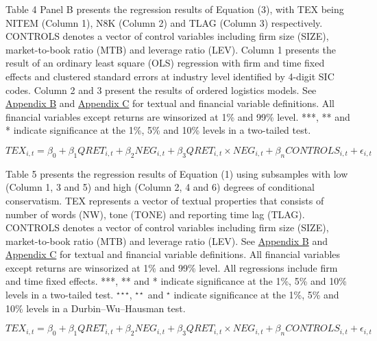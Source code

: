 Table 4 Panel B presents the regression results of Equation (3), with TEX being NITEM (Column 1), N8K (Column 2) and TLAG (Column 3) respectively. CONTROLS denotes a vector of control variables including firm size (SIZE), market-to-book ratio (MTB) and leverage ratio (LEV). Column 1 presents the result of an ordinary least square (OLS) regression with firm and time fixed effects and clustered standard errors at industry level identified by 4-digit SIC codes. Column 2 and 3 present the results of ordered logistics models. See \hyperref[appb]{Appendix B} and \hyperref[appc]{Appendix C} for textual and financial variable definitions. All financial variables except returns are winsorized at 1\% and 99\% level. ***, ** and * indicate significance at the 1\%, 5\% and 10\% levels in a two-tailed test.

\newpage

\setcounter{equation}{0}
\begin{equation}
TEX_{i,t}=\beta_0+\beta_1QRET_{i,t}+\beta_2NEG_{i,t}+\beta_3QRET_{i,t}\times NEG_{i,t}+\beta_nCONTROLS_{i,t}+\epsilon_{i,t}
\end{equation}

Table 5 presents the regression results of Equation (1) using subsamples with low (Column 1, 3 and 5) and high (Column 2, 4 and 6) degrees of conditional conservatism. TEX represents a vector of textual properties that consists of number of words (NW), tone (TONE) and reporting time lag (TLAG). CONTROLS denotes a vector of control variables including firm size (SIZE), market-to-book ratio (MTB) and leverage ratio (LEV). See \hyperref[appb]{Appendix B} and \hyperref[appc]{Appendix C} for textual and financial variable definitions. All financial variables except returns are winsorized at 1\% and 99\% level. All regressions include firm and time fixed effects. ***, ** and * indicate significance at the 1\%, 5\% and 10\% levels in a two-tailed test. $^{\star\star\star}$, $^{\star\star}$ and $^{\star}$ indicate significance at the 1\%, 5\% and 10\% levels in a Durbin–Wu–Hausman test.

\newpage

\setcounter{equation}{0}
\begin{equation}
TEX_{i,t}=\beta_0+\beta_1QRET_{i,t}+\beta_2NEG_{i,t}+\beta_3QRET_{i,t}\times NEG_{i,t}+\beta_nCONTROLS_{i,t}+\epsilon_{i,t}
\end{equation}

